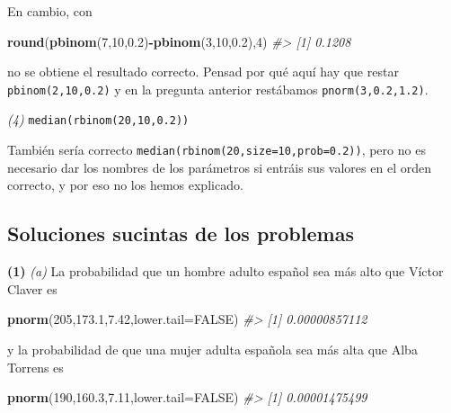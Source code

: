 \documentclass[
]{book}
\newenvironment{Shaded}{\begin{snugshade}}{\end{snugshade}}
\newcommand{\CommentTok}[1]{\textcolor[rgb]{0.56,0.35,0.01}{\textit{#1}}}
\newcommand{\DataTypeTok}[1]{\textcolor[rgb]{0.13,0.29,0.53}{#1}}
\newcommand{\DecValTok}[1]{\textcolor[rgb]{0.00,0.00,0.81}{#1}}
\newcommand{\FloatTok}[1]{\textcolor[rgb]{0.00,0.00,0.81}{#1}}
\newcommand{\KeywordTok}[1]{\textcolor[rgb]{0.13,0.29,0.53}{\textbf{#1}}}
\newcommand{\NormalTok}[1]{#1}
\newcommand{\OperatorTok}[1]{\textcolor[rgb]{0.81,0.36,0.00}{\textbf{#1}}}
\newcommand{\OtherTok}[1]{\textcolor[rgb]{0.56,0.35,0.01}{#1}}
\theoremstyle{definition}
\theoremstyle{definition}
\theoremstyle{definition}
\theoremstyle{remark}
\begin{document}
En cambio, con

\begin{Shaded}
\begin{Highlighting}[]
\KeywordTok{round}\NormalTok{(}\KeywordTok{pbinom}\NormalTok{(}\DecValTok{7}\NormalTok{,}\DecValTok{10}\NormalTok{,}\FloatTok{0.2}\NormalTok{)}\OperatorTok{{-}}\KeywordTok{pbinom}\NormalTok{(}\DecValTok{3}\NormalTok{,}\DecValTok{10}\NormalTok{,}\FloatTok{0.2}\NormalTok{),}\DecValTok{4}\NormalTok{)}
\CommentTok{\#\textgreater{} [1] 0.1208}
\end{Highlighting}
\end{Shaded}

no se obtiene el resultado correcto. Pensad por qué aquí hay que restar \texttt{pbinom(2,10,0.2)} y en la pregunta anterior restábamos \texttt{pnorm(3,0.2,1.2)}.

\emph{(4)} \texttt{median(rbinom(20,10,0.2))}

También sería correcto \texttt{median(rbinom(20,size=10,prob=0.2))}, pero no es necesario dar los nombres de los parámetros si entráis sus valores en el orden correcto, y por eso no los hemos explicado.

\hypertarget{soluciones-sucintas-de-los-problemas}{%
\subsection*{Soluciones sucintas de los problemas}\label{soluciones-sucintas-de-los-problemas}}

\textbf{(1)} \emph{(a)} La probabilidad que un hombre adulto español sea más alto que Víctor Claver es

\begin{Shaded}
\begin{Highlighting}[]
\KeywordTok{pnorm}\NormalTok{(}\DecValTok{205}\NormalTok{,}\FloatTok{173.1}\NormalTok{,}\FloatTok{7.42}\NormalTok{,}\DataTypeTok{lower.tail=}\OtherTok{FALSE}\NormalTok{)}
\CommentTok{\#\textgreater{} [1] 0.00000857112}
\end{Highlighting}
\end{Shaded}

y la probabilidad de que una mujer adulta española sea más alta que Alba Torrens es

\begin{Shaded}
\begin{Highlighting}[]
\KeywordTok{pnorm}\NormalTok{(}\DecValTok{190}\NormalTok{,}\FloatTok{160.3}\NormalTok{,}\FloatTok{7.11}\NormalTok{,}\DataTypeTok{lower.tail=}\OtherTok{FALSE}\NormalTok{)}
\CommentTok{\#\textgreater{} [1] 0.00001475499}
\end{Highlighting}
\end{Shaded}
\end{document}
